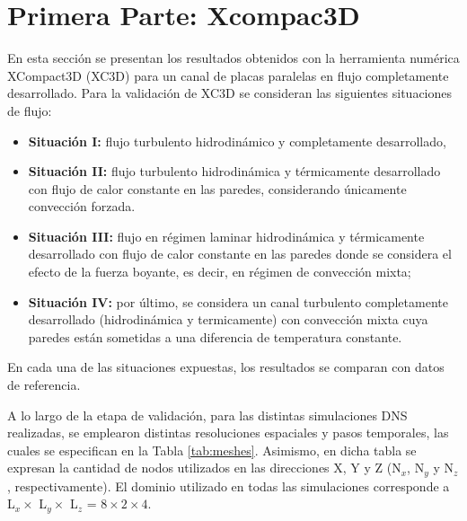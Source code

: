 
\newpage

\section{Primera Parte: Xcompac3D}

En esta sección se presentan los resultados obtenidos con la herramienta numérica XCompact3D (XC3D) para un canal de placas paralelas en flujo completamente desarrollado. Para la validación de XC3D se consideran las siguientes situaciones de flujo: 

\begin{itemize}

\item \textbf{Situación I:} flujo turbulento hidrodinámico y completamente desarrollado,

\item \textbf{Situación II:} flujo turbulento hidrodinámica y térmicamente desarrollado con flujo de calor constante en las paredes, considerando únicamente convección forzada.

\item \textbf{Situación III:} flujo en régimen laminar hidrodinámica y térmicamente desarrollado con flujo de calor constante en las paredes donde se considera el efecto de la fuerza boyante, es decir, en régimen de convección mixta; 

\item \textbf{Situación IV:} por último, se considera un canal turbulento completamente desarrollado (hidrodinámica y termicamente) con convección mixta cuya paredes están sometidas a una diferencia de temperatura constante. 

\end{itemize}
En cada una de las situaciones expuestas, los resultados se comparan con datos de referencia.

A lo largo de la etapa de validación, para las distintas simulaciones DNS realizadas, se emplearon distintas resoluciones espaciales y pasos temporales, las cuales se especifican en la Tabla \ref{tab:meshes}. Asimismo, en dicha tabla se expresan la cantidad de nodos utilizados en las direcciones X, Y y Z (N$_x$, N$_y$ y N$_z$, respectivamente). El dominio utilizado en todas las simulaciones corresponde a L$_x \times$ L$_y \times$ L$_z$ = $8 \times 2 \times 4$.

